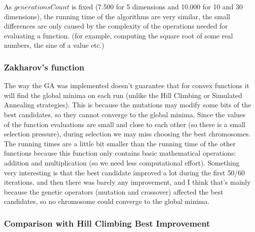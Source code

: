 \documentclass[a4paper]{article}
\begin{document}
	As $generationsCount$ is fixed (7.500 for 5 dimensions and 10.000 for 10 and 30 dimensions), the running time of the algorithms are very similar, the small differences are only caused by the complexity of the operations needed for evaluating a function. (for example, computing the square root of some real numbers, the sine of a value etc.)
	
	\subsubsection{Zakharov's function}
	
	The way the GA was implemented doesn't guarantee that for convex functions it will find the global minima on each run (unlike the Hill Climbing or Simulated Annealing strategies). This is because the mutations may modify some bits of the best candidates, so they cannot converge to the global minima. Since the values of the function evaluations are small and close to each other (so there is a small selection pressure), during selection we may miss choosing the best chromosomes. The running times are a little bit smaller than the running time of the other functions because this function only contains basic mathematical operations: addition and multiplication (so we need less computational effort). Something very interesting is that the best candidate improved a lot during the first 50/60 iterations, and then there was barely any improvement, and I think that's mainly because the genetic operators (mutation and crossover) affected the best candidates, so no chromosome could converge to the global minima.
	
	\subsubsection{Comparison with Hill Climbing Best Improvement}
		
\end{document}
